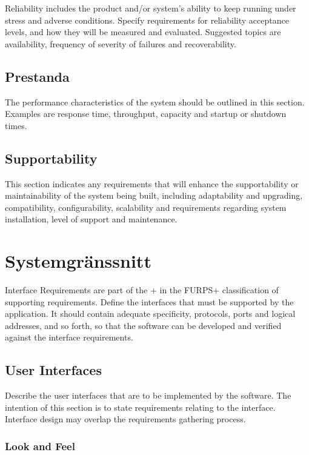 Reliability includes the product and/or system's ability to keep running under stress and adverse conditions. Specify requirements for reliability acceptance levels, and how they will be measured and evaluated. Suggested topics are availability, frequency of severity of failures and recoverability.

\subsection{Prestanda}

The performance characteristics of the system should be outlined in this section. Examples are response time, throughput, capacity and startup or shutdown times.

\subsection{Supportability}

This section indicates any requirements that will enhance the supportability or maintainability of the system being built, including adaptability and upgrading, compatibility, configurability, scalability and requirements regarding system installation, level of support and maintenance.

\section{Systemgränssnitt}

Interface Requirements are part of the + in the FURPS+ classification of supporting requirements. Define the interfaces that must be supported by the application. It should contain adequate specificity, protocols, ports and logical addresses, and so forth, so that the software can be developed and verified against the interface requirements.

\subsection{User Interfaces}

Describe the user interfaces that are to be implemented by the software. The intention of this section is to state requirements relating to the interface. Interface design may overlap the requirements gathering process.

\subsubsection{Look and Feel}


